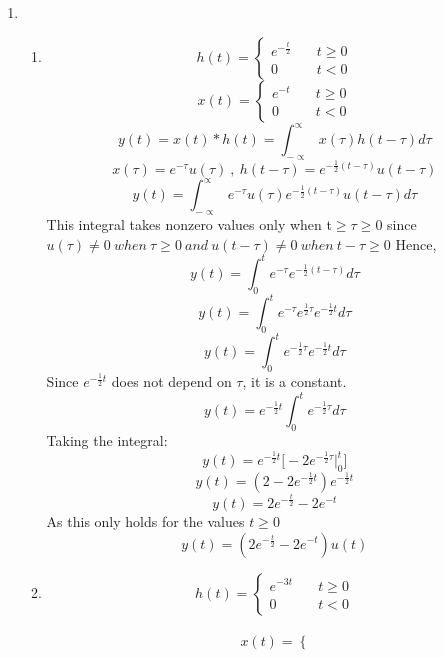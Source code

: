 \documentclass[10pt,a4paper, margin=1in]{article}
\begin{document}
\begin{enumerate}
\item %
    \begin{enumerate}
    \item %
        \begin{equation*}
h(t) = \left\{
        \begin{array}{ll}
            e^{-\frac{t}{2}} & \quad t \geq 0 \\
            0 & \quad t < 0
        \end{array}
    \right.
\end{equation*}
   \begin{equation*}
x(t) = \left\{
        \begin{array}{ll}
            e^{-t} & \quad t \geq 0 \\
            0 & \quad t < 0
        \end{array}
    \right.
\end{equation*}
\[y(t)=x(t) \ast h(t)= \int_{-\propto}^{\propto}x(\tau)h(t-\tau)d\tau\]
\[ x(\tau)=e^{-\tau}u(\tau) \ , \  h(t-\tau)=e^{-\frac{1}{2}(t-\tau)}u(t-\tau)\]
\[y(t)=\int_{-\propto}^{\propto}e^{-\tau}u(\tau)e^{-\frac{1}{2}(t-\tau)}u(t-\tau)d\tau\]
This integral takes nonzero values only when t$\geq \tau \geq 0$ since $u(\tau) \neq 0 \ when \  \tau \geq 0 \ and \ u(t-\tau) \neq 0 \ when \ t-\tau \geq 0$
Hence, 
\[y(t)=\int_{0}^{t}e^{-\tau}e^{-\frac{1}{2}(t-\tau)}d\tau\] 
\[y(t)=\int_{0}^{t}e^{-\tau}e^{\frac{1}{2}\tau}e^{-\frac{1}{2}t}d\tau\]
\[y(t)=\int_{0}^{t}e^{-\frac{1}{2}\tau}e^{-\frac{1}{2}t}d\tau\]
Since $e^{-\frac{1}{2}t}$ does not depend on $\tau$, it is a constant.
\[y(t)=e^{-\frac{1}{2}t}\int_{0}^{t}e^{-\frac{1}{2}\tau}d\tau\]
Taking the integral:
\[y(t)=e^{-\frac{1}{2}t}\Big[-2e^{-\frac{1}{2}\tau}\Big|_0^t \Big]\]
\[y(t)=(2-2e^{-\frac{1}{2}t})e^{-\frac{1}{2}t}\]
\[y(t)=2e^{-\frac{t}{2}}-2e^{-t}\]
As this only holds for the values $t \geq 0$
\[y(t)=(2e^{-\frac{t}{2}}-2e^{-t})u(t)\]
    \item %
     \begin{equation*}
h(t) = \left\{
        \begin{array}{ll}
            e^{-3t} & \quad t \geq 0 \\
            0 & \quad t < 0
        \end{array}
    \right.
\end{equation*}\\
   \begin{equation*}
x(t) = \left\{

\end{equation*}
\end{enumerate}
\end{enumerate}
\end{document}

